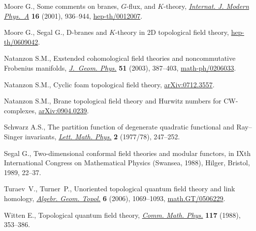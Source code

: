 \documentclass[pdftex]{sigma}
\begin{document}
\begin{thebibliography}{99}
Moore G.,
Some comments on branes, $G$-f\/lux, and $K$-theory,
\href{http://dx.doi.org/10.1142/S0217751X01004010}{{\it Internat. J. Modern Phys.~A}} {\bf  16} (2001), 936--944,
\href{http://arxiv.org/abs/hep-th/0012007}{hep-th/0012007}.

Moore G., Segal G.,
D-branes and $K$-theory in 2D topological f\/ield theory,
\href{http://arxiv.org/abs/hep-th/0609042}{hep-th/0609042}.

Natanzon S.M.,
Exstended cohomological f\/ield theories and noncommutative Frobenius manifolds,
\href{http://dx.doi.org/10.1016/j.geomphys.2003.10.014}{{\it J.~Geom. Phys.}} {\bf 51} (2003), 387--403,
\href{http://arxiv.org/abs/math-ph/0206033}{math-ph/0206033}.

Natanzon S.M.,
Cyclic foam topological f\/ield theory,
\href{http://arxiv.org/abs/0712.3557}{arXiv:0712.3557}.

Natanzon S.M.,
Brane topological f\/ield theory and Hurwitz numbers for CW-complexes,
\href{http://arxiv.org/abs/0904.0239}{arXiv:0904.0239}.

Schwarz A.S.,
The partition function of degenerate quadratic functional and Ray--Singer invariants,
\href{http://dx.doi.org/10.1007/BF00406412}{{\it Lett. Math. Phys.}} {\bf 2} (1977/78), 247--252.

Segal G.,
Two-dimensional conformal f\/ield theories and modular functors,
in IXth International Congress on Mathematical Physics (Swansea, 1988), Hilger, Bristol, 1989, 22--37.

Turaev~V., Turner~P.,
Unoriented topological quantum f\/ield theory and link homology,
\href{http://dx.doi.org/10.2140/agt.2006.6.1069}{{\it Algebr. Geom. Topol.}} {\bf 6} (2006), 1069--1093,
\href{http://arxiv.org/abs/math.GT/0506229}{math.GT/0506229}.


Witten E.,
Topological quantum f\/ield theory,
\href{http://dx.doi.org/10.1007/BF01223371}{{\it Comm. Math. Phys.}} {\bf 117} (1988), 353--386.

\end{thebibliography}\LastPageEnding
\end{document}
